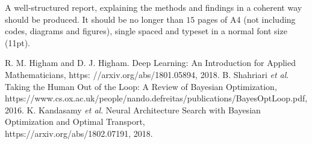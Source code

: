 \documentclass[10pt]{article}
\begin{document}
A well-structured report, explaining the methods and findings in a coherent way should be produced. It should be no longer than $15$ pages of A4 (not including codes, diagrams and figures), single spaced and typeset in a normal font size (11pt).
\vspace{-0.6cm}
\begin{thebibliography}{99}
{\sc R. M. Higham and D. J. Higham. Deep Learning: An Introduction for Applied Mathematicians, https: //arxiv.org/abs/1801.05894, 2018.}
{\sc  B. Shahriari \emph{et al}. Taking the Human Out of the Loop:
A Review of Bayesian Optimization,  \\ https://www.cs.ox.ac.uk/people/nando.defreitas/publications/BayesOptLoop.pdf, 2016.} 
{\sc K. Kandasamy \emph{et al}. Neural Architecture Search with Bayesian Optimization and Optimal Transport, \\ https://arxiv.org/abs/1802.07191, 2018.}

\end{thebibliography}
\vspace{0.2cm}
\end{document}

